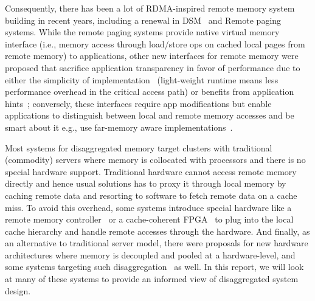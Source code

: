 Consequently, there has been a lot of RDMA-inspired remote 
memory system building in recent years, including a renewal in
DSM~\cite{farm, gam,dspm,ltdsm} and Remote 
paging~\cite{Lim2012,bladedisagg1,infiniswap,zswap,fastswap,leap} 
systems. While the remote paging systems provide native virtual memory 
interface (i.e., memory access through load/store ops on cached 
local pages from remote memory) to applications, 
other new interfaces for remote memory were proposed that 
sacrifice application transparency in favor of performance 
due to either the simplicity of 
implementation~\cite{remregions,literdma} (light-weight runtime 
means less performance overhead in the critical access path) or 
benefits from application hints~\cite{aifm}; 
conversely, these interfaces require app modifications but
enable applications to distinguish between local and remote 
memory accesses and be smart about it e.g., use far-memory 
aware implementations~\cite{Aguilera2019,semeru}.

Most systems for disaggregated memory target clusters with 
traditional (commodity) servers where memory is collocated 
with processors and there is no special hardware support.
Traditional hardware cannot access remote memory directly 
and hence usual solutions has to proxy it  
through local memory by caching remote data and resorting to 
software to fetch remote data on a cache miss. To avoid 
this overhead, some systems introduce special hardware 
like a remote memory controller~\cite{sonuma} or a 
cache-coherent FPGA~\cite{kona} to plug into 
the local cache hierarchy and handle remote accesses through 
the hardware. And finally, as an alternative to traditional 
server model, there were proposals for new 
hardware architectures where memory is decoupled and pooled
at a hardware-level, and some systems targeting such 
disaggregation~\cite{sonuma,bladedisagg1,legoos} as well. 
In this report, we will look at many of these systems to 
provide an informed view of disaggregated system design.
